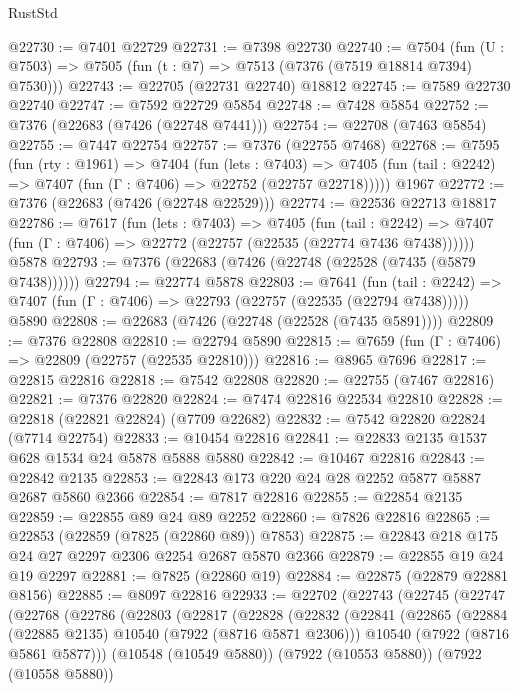 \begin{lexlean}{RustStd}
\begin{coremodule}
@22730 := @7401 @22729
@22731 := @7398 @22730
@22740 := @7504
    (fun (U : @7503) => @7505 (fun (t : @7) => @7513 (@7376 (@7519 @18814 @7394) @7530)))
@22743 := @22705 (@22731 @22740) @18812
@22745 := @7589 @22730 @22740
@22747 := @7592 @22729 @5854
@22748 := @7428 @5854
@22752 := @7376 (@22683 (@7426 (@22748 @7441)))
@22754 := @22708 (@7463 @5854)
@22755 := @7447 @22754
@22757 := @7376 (@22755 @7468)
@22768 := @7595
    (fun (rty : @1961) =>
    @7404
      (fun (lets : @7403) =>
      @7405 (fun (tail : @2242) => @7407 (fun (Γ : @7406) => @22752 (@22757 @22718)))))
    @1967
@22772 := @7376 (@22683 (@7426 (@22748 @22529)))
@22774 := @22536 @22713 @18817
@22786 := @7617
    (fun (lets : @7403) =>
    @7405
      (fun (tail : @2242) =>
      @7407 (fun (Γ : @7406) => @22772 (@22757 (@22535 (@22774 @7436 @7438))))))
    @5878
@22793 := @7376 (@22683 (@7426 (@22748 (@22528 (@7435 (@5879 @7438))))))
@22794 := @22774 @5878
@22803 := @7641
    (fun (tail : @2242) => @7407 (fun (Γ : @7406) => @22793 (@22757 (@22535 (@22794 @7438)))))
    @5890
@22808 := @22683 (@7426 (@22748 (@22528 (@7435 @5891))))
@22809 := @7376 @22808
@22810 := @22794 @5890
@22815 := @7659 (fun (Γ : @7406) => @22809 (@22757 (@22535 @22810)))
@22816 := @8965 @7696
@22817 := @22815 @22816
@22818 := @7542 @22808
@22820 := @22755 (@7467 @22816)
@22821 := @7376 @22820
@22824 := @7474 @22816 @22534 @22810
@22828 := @22818 (@22821 @22824) (@7709 @22682)
@22832 := @7542 @22820 @22824 (@7714 @22754)
@22833 := @10454 @22816
@22841 := @22833 @2135 @1537 @628 @1534 @24 @5878 @5888 @5880
@22842 := @10467 @22816
@22843 := @22842 @2135
@22853 := @22843 @173 @220 @24 @28 @2252 @5877 @5887 @2687 @5860 @2366
@22854 := @7817 @22816
@22855 := @22854 @2135
@22859 := @22855 @89 @24 @89 @2252
@22860 := @7826 @22816
@22865 := @22853 (@22859 (@7825 (@22860 @89)) @7853)
@22875 := @22843 @218 @175 @24 @27 @2297 @2306 @2254 @2687 @5870 @2366
@22879 := @22855 @19 @24 @19 @2297
@22881 := @7825 (@22860 @19)
@22884 := @22875 (@22879 @22881 @8156)
@22885 := @8097 @22816
@22933 := @22702
    (@22743
      (@22745
        (@22747
          (@22768
            (@22786
              (@22803
                (@22817
                  (@22828
                    (@22832
                      (@22841
                        (@22865
                          (@22884 (@22885 @2135) @10540 (@7922 (@8716 @5871 @2306)))
                          @10540
                          (@7922 (@8716 @5861 @5877)))
                        (@10548 (@10549 @5880))
                        (@7922 (@10553 @5880))
                        (@7922 (@10558 @5880))

\end{coremodule}
\end{lexlean}
